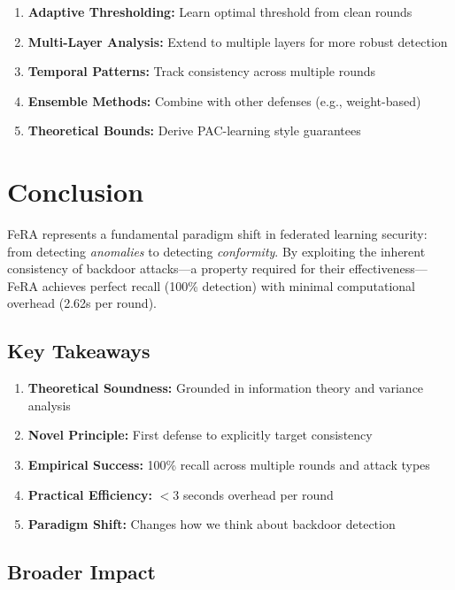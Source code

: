 \documentclass[11pt,a4paper]{article}
\begin{document}
\begin{enumerate}
    \item \textbf{Adaptive Thresholding:} Learn optimal threshold from clean rounds
    \item \textbf{Multi-Layer Analysis:} Extend to multiple layers for more robust detection
    \item \textbf{Temporal Patterns:} Track consistency across multiple rounds
    \item \textbf{Ensemble Methods:} Combine with other defenses (e.g., weight-based)
    \item \textbf{Theoretical Bounds:} Derive PAC-learning style guarantees
\end{enumerate}

\section{Conclusion}

FeRA represents a fundamental paradigm shift in federated learning security: from detecting \emph{anomalies} to detecting \emph{conformity}. By exploiting the inherent consistency of backdoor attacks---a property required for their effectiveness---FeRA achieves perfect recall (100\% detection) with minimal computational overhead (2.62s per round).

\subsection{Key Takeaways}

\begin{enumerate}
    \item \textbf{Theoretical Soundness:} Grounded in information theory and variance analysis
    \item \textbf{Novel Principle:} First defense to explicitly target consistency
    \item \textbf{Empirical Success:} 100\% recall across multiple rounds and attack types
    \item \textbf{Practical Efficiency:} $<$3 seconds overhead per round
    \item \textbf{Paradigm Shift:} Changes how we think about backdoor detection
\end{enumerate}

\subsection{Broader Impact}
\end{document}
